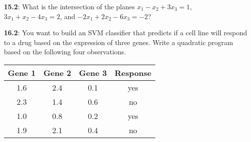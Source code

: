 \documentclass[pal,wide,12pt]{pajarticle}
\newenvironment{problem}[1]{\noindent\textbf{#1}:}{\newpage}
\begin{document}
\begin{problem}{15.2}
What is the intersection of the planes $x_1 - x_2 + 3x_3 = 1$, $3x_1 + x_2 - 4x_3 = 2$, and $-2x_1 + 2x_2 - 6x_3 = -2$?
\end{problem}

\begin{problem}{16.2}
You want to build an SVM classifier that predicts if a cell line will respond to a drug based on the expression of three genes. Write a quadratic program based on the following four observations.
\begin{center}
	\begin{tabular}{cccc}
		\toprule
		Gene 1 & Gene 2 & Gene 3 & Response \\
		\midrule
		1.6 & 2.4 & 0.1 & yes \\
		2.3 & 1.4 & 0.6 & no \\
		1.0 & 0.8 & 0.2 & yes \\
		1.9 & 2.1 & 0.4 & no \\
		\bottomrule
	\end{tabular}	
\end{center}

\end{problem}
\end{document}

